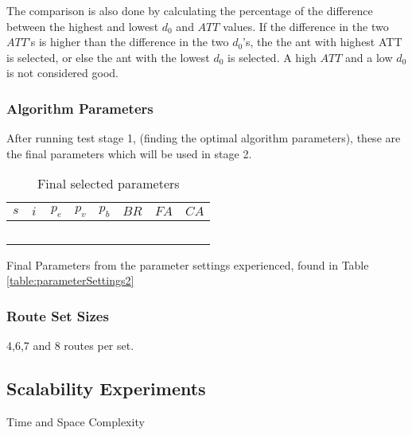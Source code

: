 The comparison is also done by calculating the percentage of the difference between the highest and lowest $d_0$ and $ATT$ values. If the difference in the two $ATT$'s is higher than the difference in the two $d_0$'s, the the ant with highest ATT is selected, or else the ant with the lowest $d_0$ is selected. A high $ATT$ and a low $d_0$ is not considered good. 

\subsubsection{Algorithm Parameters}
After running test stage 1, (finding the optimal algorithm parameters), these are the final parameters which will be used in stage 2.

\begin{table}[H]
	\centering
    \begin{tabular}{|l|l|l|l|l|l|l|l|}
 	\hline
 	$s$ & $i$ & $p_{e}$ & $p_{v}$ & $p_{b}$ & $BR$ & $FA$ & $CA$  \\
 	\hline
    ~ & ~ & ~ & ~ & ~ & ~ & ~ & ~  \\
	\hline
    \end{tabular}
    \caption {Final selected parameters}
    Final Parameters from the parameter settings experienced, found in Table \vref{table:parameterSettings2}
    \label{table:finalParameters}
	\end{table}

\subsubsection{Route Set Sizes}
4,6,7 and 8 routes per set.

\subsection{Scalability Experiments}
Time and Space Complexity
